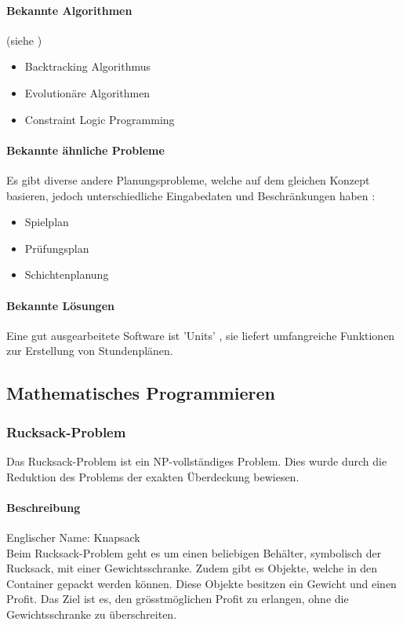 	\paragraph{Bekannte Algorithmen}
	(siehe \cite{framework_timetabling})
	\begin{itemize}
		\item Backtracking Algorithmus
		\item Evolutionäre Algorithmen
		\item Constraint Logic Programming
	\end{itemize}	

	\paragraph{Bekannte ähnliche Probleme}	
	Es gibt diverse andere Planungsprobleme, welche auf dem gleichen Konzept basieren, jedoch unterschiedliche Eingabedaten und Beschränkungen haben \cite{framework_timetabling}:
	\begin{itemize}
		\item Spielplan
		\item Prüfungsplan
		\item Schichtenplanung
	\end{itemize}

	\paragraph{Bekannte Lösungen}		
	Eine gut ausgearbeitete Software ist 'Units' \cite{unit_express}, sie liefert umfangreiche Funktionen zur Erstellung von Stundenplänen.

\subsection{Mathematisches Programmieren}\label{mathematical_programming}

	\subsubsection{Rucksack-Problem}\label{knapsack}
	Das Rucksack-Problem ist ein NP-vollständiges Problem. Dies wurde durch die Reduktion des Problems der exakten Überdeckung bewiesen.

	\paragraph{Beschreibung}
	Englischer Name: Knapsack\\
	Beim Rucksack-Problem geht es um einen beliebigen Behälter, symbolisch der Rucksack, mit einer Gewichtsschranke. Zudem gibt es Objekte, welche in den Container gepackt werden 
	können. Diese Objekte besitzen ein Gewicht und einen Profit. Das Ziel ist es, den grösstmöglichen Profit zu erlangen, ohne die Gewichtsschranke zu überschreiten. 
	\cite{knapsack_desc_web}

